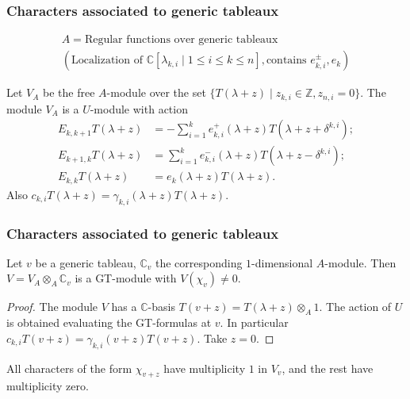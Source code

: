 \documentclass[smaller,usepdftitle=false]{beamer}
\newcommand\CC{\mathbb C}
\newcommand\ZZ{\mathbb Z}
\newcommand\ot{\otimes}
\begin{document}
\begin{frame}
\frametitle{Characters associated to generic tableaux}
\vspace{-1cm}
\begin{gather*}
A = \mbox{Regular functions over generic tableaux}  \\
(\mbox{Localization of }\CC[\lambda_{k,i} \mid 1 \leq i \leq k \leq n], 
\mbox{contains } e^\pm_{k,i}, e_k) 
\end{gather*}

\begin{Theorem}
Let $V_A$ be the free $A$-module over the set $\{T(\lambda + z) \mid z_{k,i} 
\in \ZZ, z_{n,i} = 0\}$. The module $V_A$ is a $U$-module with 
action
\vspace{-.3cm}
\begin{align*}
E_{k,k+1} T(\lambda + z) &= - \sum_{i=1}^k e^+_{k,i}(\lambda + z) 
	T(\lambda + z+\delta^{k,i}); \\
E_{k+1,k} T(\lambda + z) &= \sum_{i=1}^k e^-_{k,i}(\lambda + z) 
	T(\lambda + z -\delta^{k,i}); \\
E_{k,k} T(\lambda + z) &= e_k(\lambda + z) T(\lambda + z).
\end{align*}
Also $c_{k,i} T(\lambda + z) = \gamma_{k,i}(\lambda + z) T(\lambda + z)$.
\end{Theorem}
\end{frame}

\begin{frame}
\frametitle{Characters associated to generic tableaux}
\begin{Corollary}
Let $v$ be a generic tableau, $\CC_v$ the corresponding $1$-dimensional 
$A$-module. Then $V = V_A \ot_A \CC_v$ is a GT-module with $V(\chi_v) \neq
0$. 
\end{Corollary}
\begin{proof}
The module $V$ has a $\CC$-basis $T(v + z) = T(\lambda + z) \ot_A 1$. The 
action of $U$ is obtained evaluating the GT-formulas at $v$. In particular
$c_{k,i} T(v+z) = \gamma_{k,i}(v+z) T(v+z)$. Take $z=0$.
\end{proof}
All characters of the form $\chi_{v+z}$ have multiplicity $1$ in $V_v$, and
the rest have multiplicity zero.
\end{frame}
\end{document}
